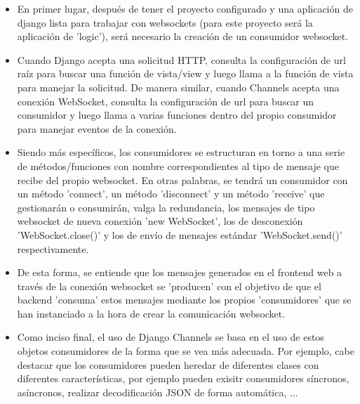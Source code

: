 \begin{itemize}
	\item En primer lugar, después de tener el proyecto configurado y una aplicación de django lista para
	      trabajar con websockets (para este proyecto será la aplicación de 'logic'), será necesario la creación de un 
	      consumidor websocket.
	\item Cuando Django acepta una solicitud HTTP, consulta la configuración de url raíz para buscar una función de vista/view y luego 
	      llama a la función de vista para manejar la solicitud. De manera similar, cuando Channels acepta una conexión WebSocket, 
	      consulta la configuración de url para buscar un consumidor y luego llama a varias funciones dentro del propio consumidor 
	      para manejar eventos de la conexión.
	\item Siendo más específicos, los consumidores se estructuran en torno a una serie de métodos/funciones con nombre correspondientes al tipo de mensaje 
	      que recibe del propio websocket. En otras palabras, se tendrá un consumidor con un método 'connect', un método 'disconnect' y un método 'receive' 
	      que gestionarán o consumirán, valga la redundancia, los mensajes de tipo websocket de nueva conexión 'new WebSocket', los de desconexión 
	      'WebSocket.close()' y los de envío de mensajes estándar 'WebSocket.send()' respectivamente.
	\item De esta forma, se entiende que los mensajes generados en el frontend web a través de la conexión websocket se 'producen' con el objetivo
	      de que el backend 'consuma' estos mensajes mediante los propios 'consumidores' que se han instanciado a la hora de crear la comunicación websocket.
	\item Como inciso final, el uso de Django Channels se basa en el uso de estos objetos consumidores de la forma que se vea 
	      más adecuada. Por ejemplo, cabe destacar que los consumidores pueden heredar de diferentes clases con diferentes características,
	      por ejemplo pueden exisitr consumidores síncronos, asíncronos, realizar decodificación JSON de forma automática, ...
\end{itemize}

